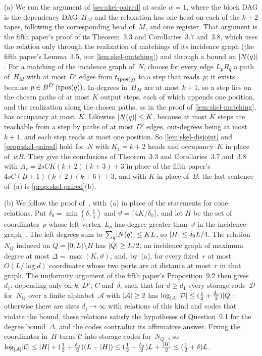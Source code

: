 \begin{outline}
(a) We run the argument of \cref{sec:skel-paired} at scale $w=1$, where the block DAG is the dependency DAG~$H_M$ and the
relaxation has one head on each of the $k+2$ tapes, following the corresponding head of~$M$, and one register. That
argument is the fifth paper's proof of its Theorem~3.3 and Corollaries~3.7 and~3.8, which uses the relation only through
the realization of matchings of its incidence graph (the fifth paper's Lemma~3.5, our \cref{lem:skel-matching}) and
through a bound on $\lvert N(q) \rvert$. For a matching of the incidence graph of~$N$, choose for every edge $L_pR_q$ a path
of~$H_M$ with at most $D'$ edges from $t_{\operatorname{tpos}(q)}$ to a step that reads~$p$; it exists because
$p\in B^{D'}(\operatorname{tpos}(q))$. In-degrees in~$H_M$ are at most $k+1$, so a step lies on the chosen paths of at most $K$ output
steps, each of which appends one position, and the realization along the chosen paths, as in the proof of
\cref{lem:skel-matching}, has occupancy at most~$K$. Likewise $\lvert N(q) \rvert\le K$, because at most $K$ steps are reachable
from a step by paths of at most $D'$ edges, out-degrees being at most $k+1$, and each step reads at most one position.
So \cref{lem:skel-disjoint} and \cref{prop:skel-paired} hold for~$N$ with $K_1=k+2$ heads and occupancy~$K$ in place
of~$wB$. They give the conclusions of Theorem~3.3 and Corollaries~3.7 and~3.8 with
$A_s=2sCK(k+2)(k+3)+3$ in place of the fifth paper's $4sC(B+1)(k+2)(k+6)+3$, and with $K$ in place of~$B$; the last
sentence of~(a) is \cref{prop:skel-paired}(b).

(b) We follow the proof of~\cite[Proposition~9.2]{DirectedRecovery2026}, with~(a) in place of the statements for cone
relations. Put $\delta_0=\min(\delta,\frac14)$ and $\vartheta=\lceil4K/\delta_0\rceil$, and let $H$ be the set of
coordinates~$p$ whose left vertex~$L_p$ has degree greater than~$\vartheta$ in the incidence
graph~\cite[Definition~2.3]{DirectedRecovery2026}. The left degrees sum to $\sum_q\lvert N(q) \rvert\le KL$, so
$\lvert H \rvert\le\delta_0L/4$. The relation~$N_Q$ induced on $Q=[0,L)\setminus H$ has $\lvert Q \rvert\ge L/2$, an incidence graph of
maximum degree at most $\Delta=\max(K,\vartheta)$, and, by~(a), for every fixed~$r$ at most $O(L/\log d)$ coordinates
whose two ports are at distance at most~$r$ in that graph. The uniformity argument of the fifth paper's
Proposition~9.2 then gives~$d_1$, depending only on $k$, $D'$, $C$ and~$\delta$, such that for $d\ge d_1$ every storage
code~$\mathcal D$ for~$N_Q$ over a finite alphabet~$\mathcal A$ with $\lvert \mathcal A \rvert\ge2$ has
$\log_{\lvert \mathcal A \rvert}\lvert \mathcal D \rvert\le(\frac12+\frac{\delta_0}2)\lvert Q \rvert$: otherwise there are sizes $d_j\to\infty$
with relations of this kind and codes that violate the bound, these relations satisfy the hypotheses of Question~9.1
for the degree bound~$\Delta$, and the codes contradict its affirmative answer. Fixing the coordinates in~$H$ turns
$\mathcal C$ into storage codes for~$N_Q$~\cite[Lemma~2.2]{DirectedRecovery2026}, so
$\log_{\lvert \mathcal A \rvert}\lvert \mathcal C \rvert\le\lvert H \rvert+(\frac12+\frac{\delta_0}2)(L-\lvert H \rvert)
\le(\frac12+\frac{\delta_0}2)L+\frac{\lvert H \rvert}2\le(\frac12+\delta)L$.


\end{outline}
